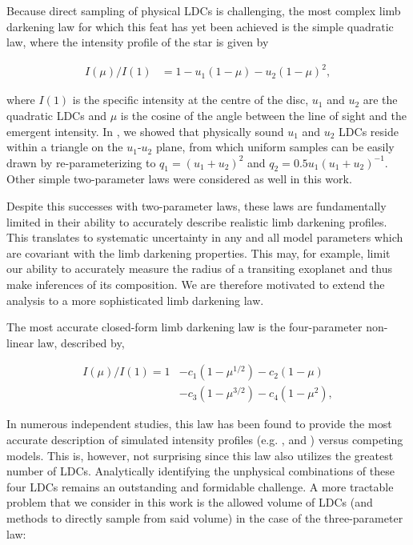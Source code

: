 Because direct sampling of physical LDCs is challenging, the most complex limb 
darkening law for which this feat has yet been achieved is the simple quadratic
law, where the intensity profile of the star is given by

\begin{align}
I(\mu)/I(1) &= 1 - u_1 (1-\mu) - u_2 (1-\mu)^2,
\label{eqn:Iquad}
\end{align}

where $I(1)$ is the specific intensity at the centre of the disc, $u_1$ and
$u_2$ are the quadratic LDCs and $\mu$ is the cosine of the angle between the 
line of sight and the emergent intensity. In \citet{LD:2013}, we showed that
physically sound $u_1$ and $u_2$ LDCs reside within a triangle on the
$u_1$-$u_2$ plane, from which uniform samples can be easily drawn by
re-parameterizing to $q_1 = (u_1+u_2)^2$ and $q_2 = 0.5u_1(u_1+u_2)^{-1}$.
Other simple two-parameter laws were considered as well in this work.

Despite this successes with two-parameter laws, these laws are fundamentally
limited in their ability to accurately describe realistic limb darkening 
profiles. This translates to systematic uncertainty in any and all model 
parameters which are covariant with the limb darkening properties. This may,
for example, limit our ability to accurately measure the radius of a transiting
exoplanet and thus make inferences of its composition. We are therefore motivated
to extend the \citet{LD:2013} analysis to a more sophisticated limb darkening
law.

The most accurate closed-form limb darkening law is the \citet{claret:2000} 
four-parameter non-linear law, described by,

\begin{align}
I(\mu)/I(1) = 1 &- c_1 (1-\mu^{1/2}) - c_2 (1-\mu) \nonumber\\
\qquad&- c_3 (1-\mu^{3/2}) - c_4 (1-\mu^{2}),
\label{eqn:Iclaret}
\end{align}

In numerous independent studies, this law has been found to provide the most 
accurate description of simulated intensity profiles (e.g. 
\citealt{claret:2000}, \citealt{sing:2010} and \citealt{magic:2015}) versus 
competing models. This is, however, not surprising since this law also utilizes 
the greatest number of LDCs. Analytically identifying the unphysical 
combinations of these four LDCs remains an outstanding and formidable challenge. 
A more tractable problem that we consider in this work is the allowed volume of 
LDCs (and methods to directly sample from said volume) in the case of the 
\citet{sing:2009} three-parameter law:

